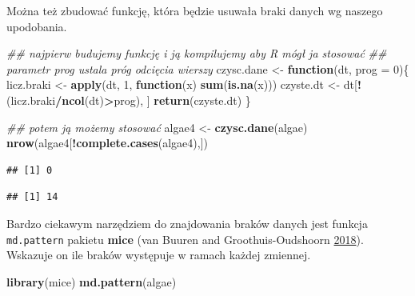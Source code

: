 \documentclass[
]{book}
\newenvironment{Shaded}{\begin{snugshade}}{\end{snugshade}}
\newcommand{\CommentTok}[1]{\textcolor[rgb]{0.56,0.35,0.01}{\textit{#1}}}
\newcommand{\ControlFlowTok}[1]{\textcolor[rgb]{0.13,0.29,0.53}{\textbf{#1}}}
\newcommand{\DataTypeTok}[1]{\textcolor[rgb]{0.13,0.29,0.53}{#1}}
\newcommand{\DecValTok}[1]{\textcolor[rgb]{0.00,0.00,0.81}{#1}}
\newcommand{\FloatTok}[1]{\textcolor[rgb]{0.00,0.00,0.81}{#1}}
\newcommand{\KeywordTok}[1]{\textcolor[rgb]{0.13,0.29,0.53}{\textbf{#1}}}
\newcommand{\NormalTok}[1]{#1}
\newcommand{\OperatorTok}[1]{\textcolor[rgb]{0.81,0.36,0.00}{\textbf{#1}}}
\newcommand{\StringTok}[1]{\textcolor[rgb]{0.31,0.60,0.02}{#1}}
\theoremstyle{plain}
\theoremstyle{definition}
\theoremstyle{definition}
\theoremstyle{definition}
\theoremstyle{definition}
\theoremstyle{remark}
\begin{document}
Można też zbudować funkcję, która będzie usuwała braki danych wg naszego upodobania.

\begin{Shaded}
\begin{Highlighting}[]
\CommentTok{## najpierw budujemy funkcję i ją kompilujemy aby R mógł ja stosować}
\CommentTok{## parametr prog ustala próg odcięcia wierszy}
\NormalTok{czysc.dane <-}\StringTok{ }\ControlFlowTok{function}\NormalTok{(dt, }\DataTypeTok{prog =} \DecValTok{0}\NormalTok{)\{}
\NormalTok{    licz.braki <-}\StringTok{ }\KeywordTok{apply}\NormalTok{(dt, }\DecValTok{1}\NormalTok{, }\ControlFlowTok{function}\NormalTok{(x) }\KeywordTok{sum}\NormalTok{(}\KeywordTok{is.na}\NormalTok{(x)))}
\NormalTok{    czyste.dt <-}\StringTok{ }\NormalTok{dt[}\OperatorTok{!}\NormalTok{(licz.braki}\OperatorTok{/}\KeywordTok{ncol}\NormalTok{(dt)}\OperatorTok{>}\NormalTok{prog), ]}
    \KeywordTok{return}\NormalTok{(czyste.dt)}
\NormalTok{\}}
    
\CommentTok{## potem ją możemy stosować}
\NormalTok{algae4 <-}\StringTok{ }\KeywordTok{czysc.dane}\NormalTok{(algae)}
\KeywordTok{nrow}\NormalTok{(algae4[}\OperatorTok{!}\KeywordTok{complete.cases}\NormalTok{(algae4),])}
\end{Highlighting}
\end{Shaded}

\begin{verbatim}
## [1] 0
\end{verbatim}

\begin{Shaded}
\end{Shaded}

\begin{verbatim}
## [1] 14
\end{verbatim}

Bardzo ciekawym narzędziem do znajdowania braków danych jest funkcja \texttt{md.pattern} pakietu \textbf{mice} (van Buuren and Groothuis-Oudshoorn \protect\hyperlink{ref-R-mice}{2018}). Wskazuje on ile braków występuje w ramach każdej zmiennej.

\begin{Shaded}
\begin{Highlighting}[]
\KeywordTok{library}\NormalTok{(mice)}
\KeywordTok{md.pattern}\NormalTok{(algae)}
\end{Highlighting}
\end{Shaded}
\end{document}
